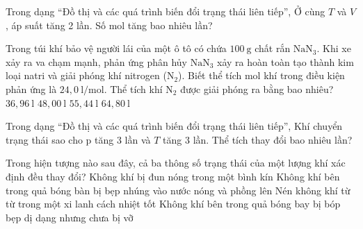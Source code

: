 \begin{ex}
Trong dạng “Đồ thị và các quá trình biến đổi trạng thái liên tiếp”, Ở cùng $T$ và $V$, áp suất tăng 2 lần. Số mol tăng bao nhiêu lần?
\end{ex}

\begin{ex}
Trong túi khí bảo vệ người lái của một ô tô có chứa $100\ \mathrm{g}$ chất rắn $\mathrm{NaN_3}$. Khi xe xảy ra va chạm mạnh, phản ứng phân hủy $\mathrm{NaN_3}$ xảy ra hoàn toàn tạo thành kim loại natri và giải phóng khí nitrogen ($\mathrm{N_2}$). Biết thể tích mol khí trong điều kiện phản ứng là $24,0\ \mathrm{l/mol}$. Thể tích khí $\mathrm{N_2}$ được giải phóng ra bằng bao nhiêu?
\choice
{$36,96\ \mathrm{l}$}
{$48,00\ \mathrm{l}$}
{\True $55,44\ \mathrm{l}$}
{$64,80\ \mathrm{l}$}
\end{ex}

\begin{ex}
Trong dạng “Đồ thị và các quá trình biến đổi trạng thái liên tiếp”, Khí chuyển trạng thái sao cho p tăng 3 lần và $T$ tăng 3 lần. Thể tích thay đổi bao nhiêu lần?
\end{ex}

\begin{ex}
Trong hiện tượng nào sau đây, cả ba thông số trạng thái của một lượng khí xác định đều thay đổi?
\choice
{Không khí bị đun nóng trong một bình kín}
{\True Không khí bên trong quả bóng bàn bị bẹp nhúng vào nước nóng và phồng lên}
{Nén không khí từ từ trong một xi lanh cách nhiệt tốt}
{Không khí bên trong quả bóng bay bị bóp bẹp dị dạng nhưng chưa bị vỡ}
\end{ex}

